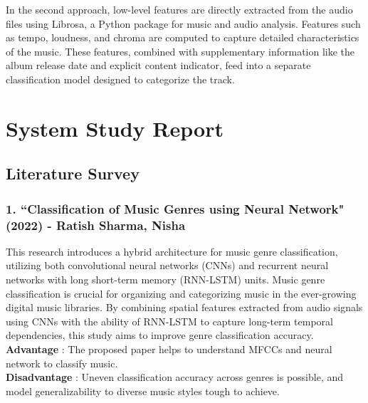 \documentclass[11pt]{report}
\begin{document}
In the second approach, low-level features are directly extracted from the audio files using Librosa, a Python package for music and audio analysis. Features such as tempo, loudness, and chroma are computed to capture detailed characteristics of the music. These features, combined with supplementary information like the album release date and explicit content indicator, feed into a separate classification model designed to categorize the track.


\chapter{System Study Report}
\section{Literature Survey}
\subsection*{1. ``Classification of Music Genres using Neural Network" (2022) - Ratish Sharma, Nisha\cite{reference1}}
This research introduces a hybrid architecture for music genre classification, utilizing both convolutional neural networks (CNNs) and recurrent neural networks with long short-term memory (RNN-LSTM) units. Music genre classification is crucial for organizing and categorizing music in the ever-growing digital music libraries. By combining spatial features extracted from audio signals using CNNs with the ability of RNN-LSTM to capture long-term temporal dependencies, this study aims to improve genre classification accuracy.
\\
\textbf{Advantage} : The proposed paper helps to understand MFCCs and neural network to classify music.\\
\textbf{Disadvantage} : Uneven classification accuracy across genres is possible, and model generalizability to diverse music styles tough to achieve.
\\
\end{document}
